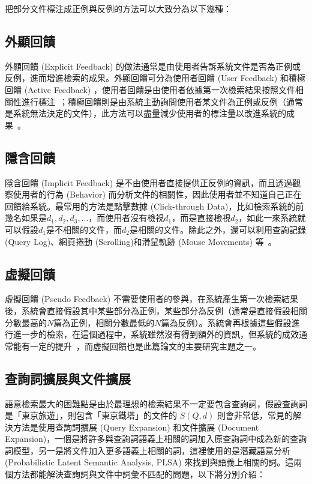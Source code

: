 把部分文件標注成正例與反例的方法可以大致分為以下幾種：

\subsection{外顯回饋}
外顯回饋 (Explicit Feedback) 的做法通常是由使用者告訴系統文件是否為正例或反例，進而增進檢索的成果。外顯回饋可分為使用者回饋 (User Feedback) 和積極回饋 (Active Feedback)
，使用者回饋是由使用者依據第一次檢索結果按照文件相關性進行標注~\cite{salton1975vector, zhai2001model, robertson1976relevance}；積極回饋則是由系統主動詢問使用者某文件為正例或反例（通常是系統無法決定的文件），此方法可以盡量減少使用者的標注量以改進系統的成果~\cite{tong2001support, goh2004multimodal, he2004mean}。

\subsection{隱含回饋}
隱含回饋 (Implicit Feedback) 是不由使用者直接提供正反例的資訊，而且透過觀察使用者的行為 (Behavior) 而分析文件的相關性，因此使用者並不知道自己正在回饋給系統。最常用的方法是點擊數據 (Click-through Data)，比如檢索系統的前幾名如果是$d_1, d_2, d_3, ...$，而使用者沒有檢視$d_1$，而是直接檢視$d_2$，如此一來系統就可以假設$d_1$是不相關的文件，而$d_2$是相關的文件。除此之外，還可以利用查詢記錄 (Query Log)、網頁捲動
(Scrolling)和滑鼠軌跡 (Mouse Movements) 等~\cite{kelly2003implicit}。

\subsection{虛擬回饋}
\label{sec:pseudo_feedback}
虛擬回饋 (Pseudo Feedback) 不需要使用者的參與，在系統產生第一次檢索結果後，系統會直接假設其中某些部分為正例，某些部分為反例（通常是直接假設相關分數最高的$N$篇為正例，相關分數最低的$N$篇為反例）。系統會再根據這些假設進行進一步的檢索，在這個過程中，系統雖然沒有得到額外的資訊，但系統的成效通常能有一定的提升~\cite{kurland2005better, xu1996query, yu2003improving, sakai2005flexible, cao2008selecting, lee2008cluster, lv2009comparative, lv2010positional}，而虛擬回饋也是此篇論文的主要研究主題之一。

\subsection{查詢詞擴展與文件擴展}
\label{sec:query_doc_exp}
語意檢索最大的困難點是由於最理想的檢索結果不一定要包含查詢詞，假設查詢詞是「東京旅遊」，則包含「東京鐵塔」的文件的 $S(Q, d)$ 則會非常低，常見的解決方法是使用查詢詞擴展 (Query Expansion) 和文件擴展 (Document Expansion)，一個是將許多與查詢詞語義上相關的詞加入原查詢詞中成為新的查詢詞模型，另一是將文件加入更多語義上相關的詞，這裡使用的是潛藏語意分析 (Probabilistic Latent Semantic Analysis, PLSA) 來找到與語義上相關的詞。這兩個方法都能解決查詢詞與文件中詞彙不匹配的問題，以下將分別介紹：

